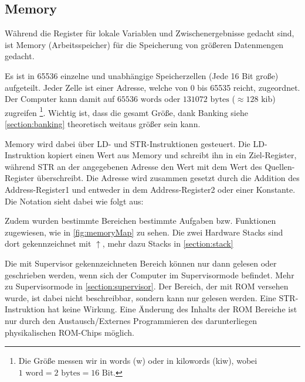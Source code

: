 \documentclass{scrartcl}
\begin{document}
\subsection{\label{section:memory}Memory}

Während die Register für lokale Variablen und Zwischenergebnisse gedacht sind, ist Memory (Arbeitsspeicher) für die Speicherung von größeren Datenmengen gedacht.

Es ist in 65536 einzelne und unabhängige Speicherzellen (Jede 16 Bit große) aufgeteilt.
Jeder Zelle ist einer Adresse, welche von 0 bis 65535 reicht, zugeordnet.
Der Computer kann damit auf $65536 \text{ words}$ oder $131072 \text{ bytes}$ ($\approx 128 \text{ kib}$) zugreifen
\footnote{Die Größe messen wir in words (w) oder in kilowords (kiw), wobei $1 \text{ word} = 2 \text{ bytes} = 16 \text{ Bit}$.}.
Wichtig ist, dass die gesamt Größe, dank Banking siehe \autoref{section:banking} theoretisch weitaus größer sein kann.

Memory wird dabei über LD- und STR-Instruktionen gesteuert.
Die LD-Instruktion kopiert einen Wert aus Memory und schreibt ihn in ein Ziel-Register, während STR an der angegebenen Adresse den Wert mit dem Wert des Quellen-Register überschreibt.
Die Adresse wird zusammen gesetzt durch die Addition des Address-Register1 und entweder in dem Address-Register2 oder einer Konstante.
Die Notation sieht dabei wie folgt aus:






Zudem wurden bestimmte Bereichen bestimmte Aufgaben bzw. Funktionen zugewiesen, wie in \autoref{fig:memoryMap} zu sehen.
Die zwei Hardware Stacks sind dort gekennzeichnet mit $\uparrow$, mehr dazu Stacks in \autoref{section:stack}

Die mit Supervisor gekennzeichneten Bereich können nur dann gelesen oder geschrieben werden, wenn sich der Computer im Supervisormode befindet.
Mehr zu Supervisormode in \autoref{section:supervisor}.
Der Bereich, der mit ROM versehen wurde, ist dabei nicht beschreibbar, sondern kann nur gelesen werden.
Eine STR-Instruktion hat keine Wirkung.
Eine Änderung des Inhalts der ROM Bereiche ist nur durch den Austausch/Externes Programmieren des darunterliegen physikalischen ROM-Chips möglich.
\end{document}
